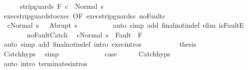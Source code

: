 \begin{isabellebody}
\ \ \ \ \isamarkupfalse%
\ {\isachardoublequoteopen}{\isasymGamma}{\isasymturnstile}strip{\isacharunderscore}guards\ F\ c{}\ {\isasymdown}\ Normal\ s{\isacharprime}{\isachardoublequoteclose}\isanewline
\ \ \ \ \isamarkupfalse%
\ {\isacharminus}\isanewline
\ \ \ \ \ \ \isamarkupfalse%
\ exec{\isacharunderscore}strip{\isacharunderscore}guards{\isacharunderscore}to{\isacharunderscore}exec\ {\isacharbrackleft}OF\ exec{\isacharunderscore}strip{\isacharunderscore}guards{\isacharunderscore}c{}{\isacharbrackright}\ noFault{\isacharunderscore}c{}\isanewline
\ \ \ \ \ \ \isamarkupfalse%
\ {\isacharasterisk}{\isacharcolon}\ {\isachardoublequoteopen}{\isasymGamma}{\isasymturnstile}{\isasymlangle}c{}{\isacharcomma}Normal\ s\ {\isasymrangle}\ {\isasymRightarrow}\ Abrupt\ s{\isacharprime}{\isachardoublequoteclose}\isanewline
\ \ \ \ \ \ \ \ \isamarkupfalse%
\ {\isacharparenleft}auto\ simp\ add{\isacharcolon}\ final{\isacharunderscore}notin{\isacharunderscore}def\ elim{\isacharbang}{\isacharcolon}\ isFaultE{\isacharparenright}\isanewline
\ \ \ \ \ \ \isamarkupfalse%
\ noFault{\isacharunderscore}Catch\ \isamarkupfalse%
\ {\isachardoublequoteopen}{\isasymGamma}{\isasymturnstile}{\isasymlangle}c{}{\isacharcomma}Normal\ s{\isacharprime}\ {\isasymrangle}\ {\isasymRightarrow}{\isasymnotin}Fault\ {\isacharbackquote}\ F{\isachardoublequoteclose}\isanewline
\ \ \ \ \ \ \ \ \isamarkupfalse%
\ {\isacharparenleft}auto\ simp\ add{\isacharcolon}\ final{\isacharunderscore}notin{\isacharunderscore}def\ intro{\isacharcolon}\ exec{\isachardot}intros{\isacharparenright}\isanewline
\ \ \ \ \ \ \isamarkupfalse%
\ {\isacharasterisk}\ \isamarkupfalse%
\ {\isacharquery}thesis\isanewline
\ \ \ \ \ \ \ \ \isamarkupfalse%
\ Catch{\isachardot}hyps\ \isamarkupfalse%
\ simp\isanewline
\ \ \ \ \isamarkupfalse%
\isanewline
\ \ \isacommand{{\isacharbraceright}}\isamarkupfalse%
\isanewline
\ \ \isamarkupfalse%
\ \isamarkupfalse%
\ {\isacharquery}case\isanewline
\ \ \ \ \isamarkupfalse%
\ Catch{\isachardot}hyps\ \isamarkupfalse%
\ {\isacharparenleft}auto\ intro{\isacharcolon}\ terminates{\isachardot}intros{\isacharparenright}\isanewline
{}\isamarkupfalse%
%
\endisatagproof
{\isafoldproof}%
%
\isadelimproof
%
\endisadelimproof
%
\end{isabellebody}
